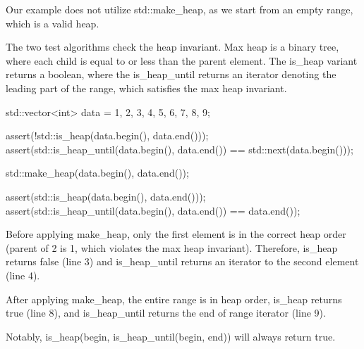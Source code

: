 Our example does not utilize std::make\_heap, as we start from an empty range, which is a valid heap.



The two test algorithms check the heap invariant. Max heap is a binary tree, where each child is equal to or less than the parent element. The is\_heap variant returns a boolean, where the is\_heap\_until returns an iterator denoting the leading part of the range, which satisfies the max heap invariant.

\begin{box-note}
\begin{cppcode}
std::vector<int> data = {1, 2, 3, 4, 5, 6, 7, 8, 9};

assert(!std::is_heap(data.begin(), data.end()));
assert(std::is_heap_until(data.begin(), data.end()) == std::next(data.begin()));

std::make_heap(data.begin(), data.end());

assert(std::is_heap(data.begin(), data.end()));
assert(std::is_heap_until(data.begin(), data.end()) == data.end());
\end{cppcode}
\end{box-note}

Before applying make\_heap, only the first element is in the correct heap order (parent of 2 is 1, which violates the max heap invariant). Therefore, is\_heap returns false (line 3) and is\_heap\_until returns an iterator to the second element (line 4).

After applying make\_heap, the entire range is in heap order, is\_heap returns true (line 8), and is\_heap\_until returns the end of range iterator (line 9).

Notably, is\_heap(begin, is\_heap\_until(begin, end)) will always return true.